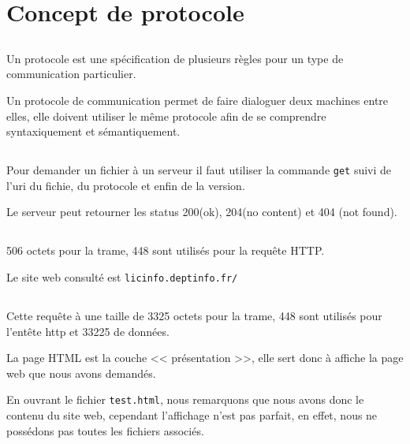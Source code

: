 \documentclass[a4paper, 11pt]{article}
\newcommand{\http}{\bsc{http}}
\begin{document}
	\maketitle
	\setcounter{section}{1}
	\section{Concept de protocole}
	\subsection{}
	Un protocole est une spécification de plusieurs règles pour un type de communication particulier.

	Un protocole de communication permet de faire dialoguer deux machines entre elles, elle doivent
	utiliser le même protocole afin de se comprendre syntaxiquement et sémantiquement.

	\subsection{}
	Pour demander un fichier à un serveur \http{} il faut utiliser la commande \texttt{get}	suivi de l'uri du fichie, du protocole et enfin de la version.

	Le serveur peut retourner les status 200(ok), 204(no content) et 404 (not found).
	\subsection{}
	506 octets pour la trame, 448 sont utilisés pour la requête HTTP.

	Le site web consulté est \texttt{licinfo.deptinfo.fr/}
	\subsection{}
	Cette requête à une taille de 3325 octets pour la trame, 448 sont utilisés pour l’entête http et 33225 de données.

		La page HTML est la couche << présentation >>, elle sert donc à affiche la page web que nous avons demandés. 

		En ouvrant le fichier \texttt{test.html}, nous remarquons que nous avons donc le contenu du site web, cependant l'affichage n'est pas parfait, en effet, nous ne possédons pas toutes les fichiers associés. 
\end{document}
